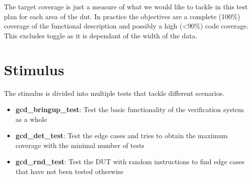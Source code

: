 The target coverage is just a measure of what we would like to tackle in this test plan for each area of the dut.
In practice the objectives are a complete (100\%) coverage of the functional description and possibly a high (\textless 90\%) code coverage.
This excludes toggle as it is dependant of the width of the data.

\section{Stimulus}

The stimulus is divided into multiple tests that tackle different scenarios.
\begin{itemize}
    \item \textbf{gcd\_bringup\_test}: Test the basic functionality of the verification system as a whole
    \item \textbf{gcd\_det\_test}: Test the edge cases and tries to obtain the maximum coverage with the minimal number of tests
    \item \textbf{gcd\_rnd\_test}: Test the DUT with random instructions to find edge cases that have not been tested otherwise
\end{itemize}
